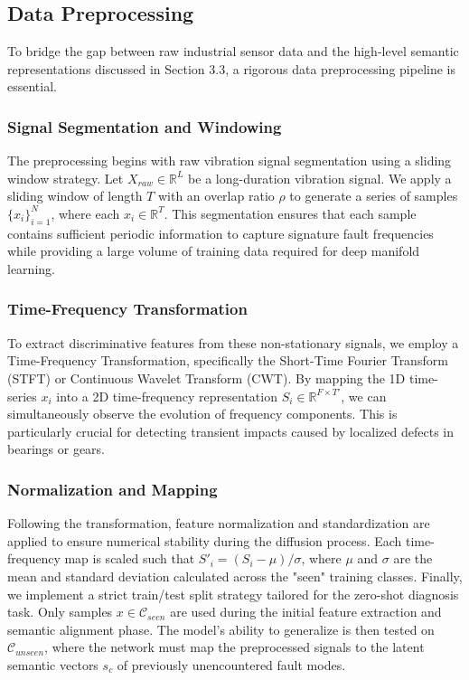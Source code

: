 \subsection{Data Preprocessing}
To bridge the gap between raw industrial sensor data and the high-level semantic representations discussed in Section 3.3, a rigorous data preprocessing pipeline is essential.

\subsubsection{Signal Segmentation and Windowing}
The preprocessing begins with raw vibration signal segmentation using a sliding window strategy. Let $X_{raw} \in \mathbb{R}^L$ be a long-duration vibration signal. We apply a sliding window of length $T$ with an overlap ratio $\rho$ to generate a series of samples $\{x_i\}_{i=1}^N$, where each $x_i \in \mathbb{R}^T$. This segmentation ensures that each sample contains sufficient periodic information to capture signature fault frequencies while providing a large volume of training data required for deep manifold learning.

\subsubsection{Time-Frequency Transformation}
To extract discriminative features from these non-stationary signals, we employ a Time-Frequency Transformation, specifically the Short-Time Fourier Transform (STFT) or Continuous Wavelet Transform (CWT). By mapping the 1D time-series $x_i$ into a 2D time-frequency representation $S_i \in \mathbb{R}^{F \times T'}$, we can simultaneously observe the evolution of frequency components. This is particularly crucial for detecting transient impacts caused by localized defects in bearings or gears.

\subsubsection{Normalization and Mapping}
Following the transformation, feature normalization and standardization are applied to ensure numerical stability during the diffusion process. Each time-frequency map is scaled such that $S'_i = (S_i - \mu) / \sigma$, where $\mu$ and $\sigma$ are the mean and standard deviation calculated across the "seen" training classes. Finally, we implement a strict train/test split strategy tailored for the zero-shot diagnosis task. Only samples $x \in \mathcal{C}_{seen}$ are used during the initial feature extraction and semantic alignment phase. The model's ability to generalize is then tested on $\mathcal{C}_{unseen}$, where the network must map the preprocessed signals to the latent semantic vectors $s_c$ of previously unencountered fault modes.